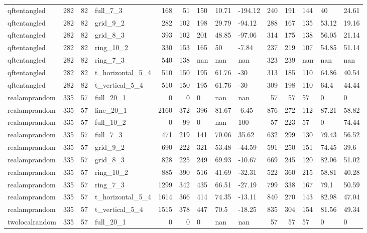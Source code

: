 \begin{longtable}{lrrlrrlllrrlll}
qftentangled & 282 & 82 & full\_7\_3 & 168 & 51 & 150 & 10.71 & -194.12 & 240 & 191 & 144 & 40 & 24.61 \\
qftentangled & 282 & 82 & grid\_9\_2 & 282 & 102 & 198 & 29.79 & -94.12 & 288 & 167 & 135 & 53.12 & 19.16 \\
qftentangled & 282 & 82 & grid\_8\_3 & 393 & 102 & 201 & 48.85 & -97.06 & 314 & 175 & 138 & 56.05 & 21.14 \\
qftentangled & 282 & 82 & ring\_10\_2 & 330 & 153 & 165 & 50 & -7.84 & 237 & 219 & 107 & 54.85 & 51.14 \\
qftentangled & 282 & 82 & ring\_7\_3 & 540 & 138 & nan & nan & nan & 323 & 239 & nan & nan & nan \\
qftentangled & 282 & 82 & t\_horizontal\_5\_4 & 510 & 150 & 195 & 61.76 & -30 & 313 & 185 & 110 & 64.86 & 40.54 \\
qftentangled & 282 & 82 & t\_vertical\_5\_4 & 510 & 150 & 195 & 61.76 & -30 & 309 & 198 & 110 & 64.4 & 44.44 \\
realamprandom & 335 & 57 & full\_20\_1 & 0 & 0 & 0 & nan & nan & 57 & 57 & 57 & 0 & 0 \\
realamprandom & 335 & 57 & line\_20\_1 & 2160 & 372 & 396 & 81.67 & -6.45 & 876 & 272 & 112 & 87.21 & 58.82 \\
realamprandom & 335 & 57 & full\_10\_2 & 0 & 99 & 0 & nan & 100 & 57 & 223 & 57 & 0 & 74.44 \\
realamprandom & 335 & 57 & full\_7\_3 & 471 & 219 & 141 & 70.06 & 35.62 & 632 & 299 & 130 & 79.43 & 56.52 \\
realamprandom & 335 & 57 & grid\_9\_2 & 690 & 222 & 321 & 53.48 & -44.59 & 591 & 250 & 151 & 74.45 & 39.6 \\
realamprandom & 335 & 57 & grid\_8\_3 & 828 & 225 & 249 & 69.93 & -10.67 & 669 & 245 & 120 & 82.06 & 51.02 \\
realamprandom & 335 & 57 & ring\_10\_2 & 885 & 390 & 516 & 41.69 & -32.31 & 522 & 360 & 215 & 58.81 & 40.28 \\
realamprandom & 335 & 57 & ring\_7\_3 & 1299 & 342 & 435 & 66.51 & -27.19 & 799 & 338 & 167 & 79.1 & 50.59 \\
realamprandom & 335 & 57 & t\_horizontal\_5\_4 & 1614 & 366 & 414 & 74.35 & -13.11 & 840 & 270 & 143 & 82.98 & 47.04 \\
realamprandom & 335 & 57 & t\_vertical\_5\_4 & 1515 & 378 & 447 & 70.5 & -18.25 & 835 & 304 & 154 & 81.56 & 49.34 \\
twolocalrandom & 335 & 57 & full\_20\_1 & 0 & 0 & 0 & nan & nan & 57 & 57 & 57 & 0 & 0 \\

\end{longtable}
